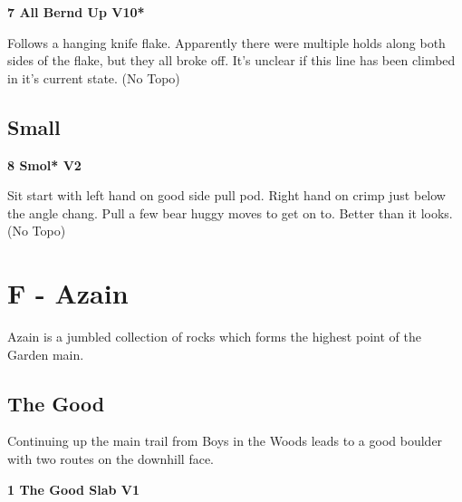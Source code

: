 \begin{multicols}{2}
			
			
			\needspace{1.5cm}
\label{rt:All Bernd Up}
\colorbox{red!20}{
\parbox{0.95\linewidth}{
\textbf{
7 All Bernd Up V10*  
}}}

			\begin{adjustwidth}{0.5cm}{}			
			Follows a hanging knife flake. Apparently there were multiple holds along both sides of the flake, but they all broke off. It's unclear if this line has been climbed in it's current state. (No Topo)
			\end{adjustwidth}
			
			
		
		
		\needspace{1.5cm}
		\subsection*{Small}\label{bf:Small}
			
		
			
			\needspace{1.5cm}
\label{rt:Smol}
\colorbox{green!20}{
\parbox{0.95\linewidth}{
\textbf{
8 Smol* V2  
}}}

			\begin{adjustwidth}{0.5cm}{}			
			Sit start with left hand on good side pull pod. Right hand on crimp just below the angle chang. Pull a few bear huggy moves to get on to. Better than it looks. (No Topo)
			\end{adjustwidth}
			
			
		
	
\newpage


		\section{F - Azain}\label{sa:Azain}
	Azain is a jumbled collection of rocks which forms the highest point of the Garden main.\\

	
	


		\needspace{1.5cm}
		\subsection*{The Good}\label{bf:The Good}
		Continuing up the main trail from Boys in the Woods leads to a good boulder with two routes on the downhill face.\\
	
		
			
			\needspace{1.5cm}
\label{rt:The Good Slab}
\colorbox{green!20}{
\parbox{0.95\linewidth}{
\textbf{
1 The Good Slab V1  
}}}


\end{multicols}
